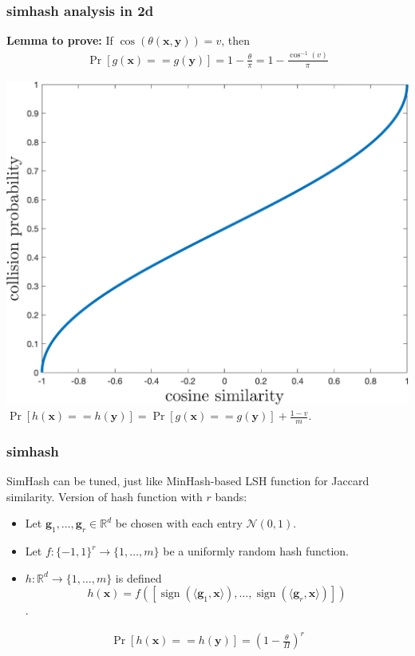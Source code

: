 \documentclass[compress]{beamer}
\newcommand{\bv}[1]{\mathbf{#1}}
\newcommand{\R}{\mathbb{R}}
\DeclareMathOperator{\sign}{sign}
\begin{document}
%		



\begin{frame}[t]
	\frametitle{simhash analysis in 2d}
	\textbf{Lemma to prove:} If $\cos(\theta(\bv{x},\bv{y})) = v$, then 
	\begin{align*}
		\Pr[g(\bv{x}) == g(\bv{y})] = 1 - \frac{\theta}{\pi}= 1 - \frac{\cos^{-1}(v)}{\pi}
	\end{align*}
	\begin{center}
		\vspace{-.5em}
		\includegraphics[width=.6\textwidth]{cosine_sim.png}
		$\Pr[h(\bv{x}) == h(\bv{y})] = \Pr[g(\bv{x}) == g(\bv{y})] + \frac{1-v}{m}$.
	\end{center}
\end{frame}

\begin{frame}
	\frametitle{simhash}
	SimHash can be tuned, just like MinHash-based LSH function for Jaccard similarity. Version of hash function with $r$ bands:
	\begin{itemize}
		\item Let $\bv{g}_1,\ldots, \bv{g}_r \in \R^d$ be chosen with each entry $\mathcal{N}(0,1)$. 
		\item Let $f: \{-1,1\}^r \rightarrow \{1,\ldots, m\}$ be a uniformly random hash function. 
		\item $h: \R^d \rightarrow \{1,\ldots, m\}$ is defined $$h(\bv{x}) = f\left([\sign(\langle \bv{g}_1, \bv{x} \rangle),\ldots, \sign(\langle \bv{g}_r, \bv{x} \rangle)]\right)$$.
	\end{itemize}
\begin{align*}
	\Pr[h(\bv{x}) == h(\bv{y})] = \left(1-\frac{\theta}{\Pi}\right)^r
\end{align*}
\end{frame}
\end{document}
